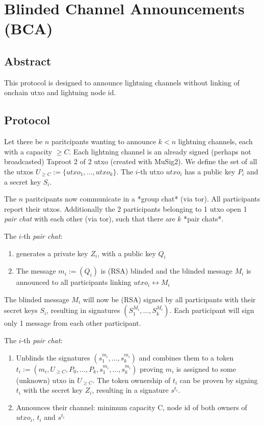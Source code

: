 \documentclass[]{article}
\begin{document}
\section{Blinded Channel Announcements    (BCA)}


\subsection{ Abstract}
This protocol is designed to announce lightning channels without linking of onchain utxo and lightning node id.

\subsection{ Protocol}

Let there be $n$ paritcipants wanting to announce $k < n $ lightning channels, each with a capacity $ \geq C $.
Each lightning channel is an already signed (perhaps not broadcasted) Taproot 2 of 2 utxo (created with MuSig2).  We define the set of all the utxos $U_{\geq C} := \{utxo_1, \dots, utxo_k  \}$.
The $i$-th utxo $utxo_i$ has a public key $P_i$ and a secret key $S_i$.

The $n$ paritcipants now communicate in a *group chat* (via tor). All participants report their utxos.
Additionally the 2 participants belonging to 1 utxo open 1 \textit{pair chat} with each other (via tor), such that there are $k$ *pair chats*.

The $i$-th \textit{pair chat}:
\begin{enumerate}
 \item generates a private key $Z_i$, with a public key $Q_i$
 \item The message $m_i := (Q_i)$ is (RSA) blinded and the blinded message $M_i$ is announced to all participants linking $utxo_i \leftrightarrow M_i$
\end{enumerate}



The blinded message $M_i$ will now be (RSA) signed by all participants with their secret keys $S_i$, resulting in signatures $(S_1^{M_i}, \dots, S_k^{M_i})$.  Each participant will sign only 1 message from each other participant.

The $i$-th  \textit{pair chat}:
\begin{enumerate}
 \item Unblinds the signatures $(s_1^{m_i}, \dots, s_k^{m_i})$ and combines them to a token $t_i := (m_i,U_{\geq C}, P_0, \dots, P_k,  s_1^{m_i}, \dots, s_k^{m_i})$ proving $m_i$ is assigned to some (unknown) utxo in $U_{\geq C} $. The token ownership of $t_i$ can be proven by signing $t_i$ with the secret key $Z_i$, resulting in a signature $s^{t_i}$.
 \item Announces their channel: minimum capacity C, node id of both owners of $utxo_i$, $t_i$ and $s^{t_i}$

\end{enumerate}
\end{document}
